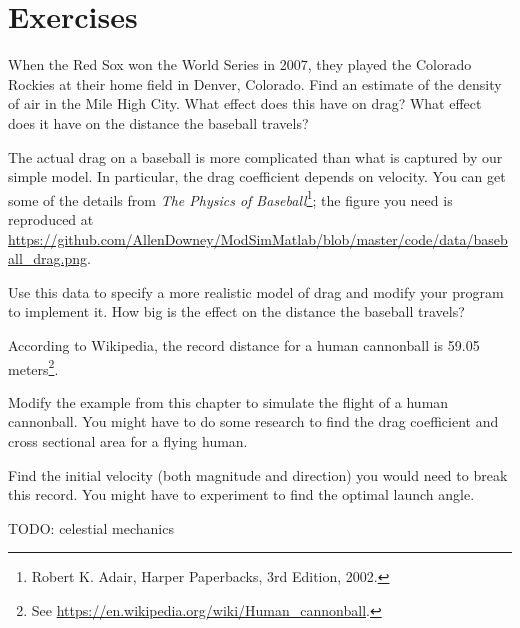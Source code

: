 \documentclass[
]{book}
\numberwithin{Answer}{chapter}
\numberwithin{Exercise}{chapter}
\begin{document}
\section{Exercises}

\begin{ex}
When the Red Sox won the World Series in 2007, they played the
Colorado Rockies at their home field in Denver, Colorado.  Find an
estimate of the density of air in the Mile High City.  What effect
does this have on drag?  What effect does it have on the distance the baseball travels?
\end{ex}

\begin{ex}
The actual drag on a baseball is more complicated than what is
captured by our simple model.  In particular, the drag coefficient
depends on velocity.  You can get some of the details from {\em The
Physics of Baseball}\footnote{Robert K. Adair, Harper Paperbacks, 3rd
Edition, 2002.}; the figure you need is reproduced at \url{https://github.com/AllenDowney/ModSimMatlab/blob/master/code/data/baseball_drag.png}.

Use this data to specify a more realistic model of drag and modify your
program to implement it.  How big is the effect on the distance the baseball travels?
\end{ex}


\begin{ex}
\label{ex:cannon}
According to Wikipedia, the record distance for a human cannonball is 59.05 meters\footnote{See \url{https://en.wikipedia.org/wiki/Human_cannonball}.}.

Modify the example from this chapter to simulate the flight of a human cannonball.  You might have to do some research to find the drag coefficient and cross sectional area for a flying human.

Find the initial velocity (both magnitude and direction) you would need to break this record.  You might have to experiment to find the optimal launch angle.
\end{ex}

\begin{ex}
TODO: celestial mechanics
\end{ex}


\end{document}
